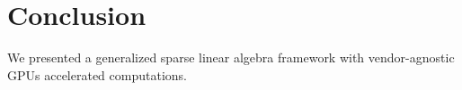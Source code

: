 \section{Conclusion}

We presented a generalized sparse linear algebra framework with vendor-agnostic GPUs accelerated computations.